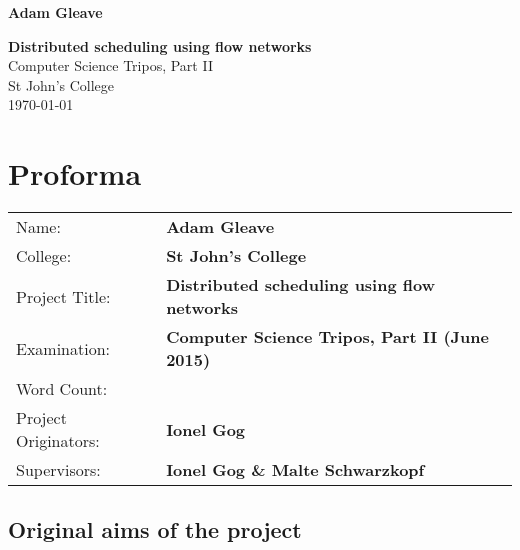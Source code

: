 \documentclass[12pt,a4paper,twoside,notitlepage]{report}
\theoremstyle{definition}
\begin{document}

\pagestyle{empty}

\hfill{\large \bf Adam Gleave}

\vspace*{30mm}

\begin{center}
	\LARGE{\textbf{Distributed scheduling using flow networks}} \hspace*{\fill} \\

	\vspace*{5mm}
	Computer Science Tripos, Part II \\
	\vspace*{5mm}
	St John's College \\
	\vspace*{5mm}
	\today
\end{center}
\clearpage


\setcounter{page}{1}
\pagestyle{plain}
\chapter*{Proforma}
\vspace*{-2em}
{
	\begin{tabular}{ll}
		Name:			& \textbf{Adam Gleave}					\\
		College:		& \textbf{St John's College}\\
    Project Title:	& \textbf{Distributed scheduling using flow networks}\\
		Examination:	& \textbf{Computer Science Tripos, Part II (June 2015)}\\
    Word Count:		& \textbf{ \unskip}\\
		Project Originators:	& \textbf{Ionel Gog}\\
    Supervisors:	& \textbf{Ionel Gog \& Malte Schwarzkopf}\\
	\end{tabular}
}

\renewcommand{\arraystretch}{1.3}
\vspace*{-1em}
\section*{Original aims of the project}
\end{document}
